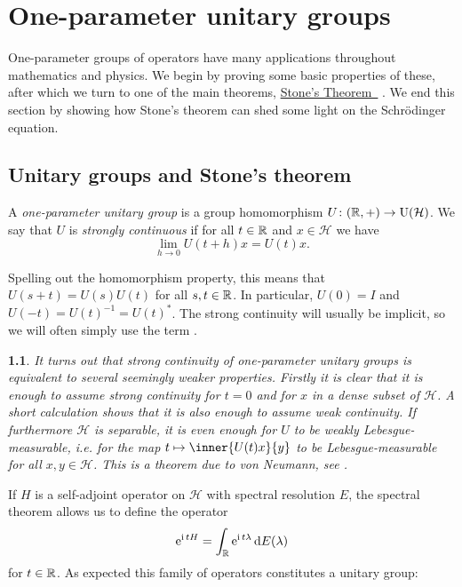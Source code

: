 \documentclass[article, a4paper, 11pt, oneside]{memoir}
\makeatletter
\numberwithin{equation}{chapter}
\newcommand{\calH}{\mathcal{H}}
\theoremstyle{myexample}
\newtheorem{remark}[theorem]{\protect\@remark}
\theoremstyle{myexample}
\theoremstyle{myexamplebreak}
\theoremstyle{myexamplebreak}
\theoremstyle{nonumberplain}
\theoremstyle{MyNonumberplain}
\newcommand{\mynameref}[2]{%
    \hyperref[#1]{#2~\labelcref*{#1}}%
}
\newcommand{\@remark}{}
\renewcommand{\@remark}{Remark}%
\renewcommand{\@remark}{Bemærkning}%
\makeatother
\begin{document}
\chapter{One-parameter unitary groups}

One-parameter groups of operators have many applications throughout mathematics and physics. We begin by proving some basic properties of these, after which we turn to one of the main theorems, \mynameref{thm:stone}{Stone's Theorem}. We end this section by showing how Stone's theorem can shed some light on the Schrödinger equation.


\section{Unitary groups and Stone's theorem}

\begin{definition}
    A \emph{one-parameter unitary group} is a group homomorphism $U \colon (\setR, +) \to \unitary(\calH)$. We say that $U$ is \emph{strongly continuous} if for all $t \in \mathbb{R}$ and $x \in \calH$ we have
    \begin{equation*}
        \lim_{h \to 0} U(t + h)x = U(t)x.
    \end{equation*}
\end{definition}
%
Spelling out the homomorphism property, this means that $U(s+t) = U(s) U(t)$ for all $s,t \in \mathbb{R}$. In particular, $U(0) = I$ and $U(-t) = U(t)^{-1} = U(t)^*$. The strong continuity will usually be implicit, so we will often simply use the term .

\begin{remark}
    \label{rem:strong_continuity}
    It turns out that strong continuity of one-parameter unitary groups is equivalent to several seemingly weaker properties. Firstly it is clear that it is enough to assume strong continuity for $t = 0$ and for $x$ in a dense subset of $\calH$. A short calculation shows that it is also enough to assume weak continuity. If furthermore $\calH$ is separable, it is even enough for $U$ to be weakly Lebesgue-measurable, i.e. for the map $t \mapsto \inner{U(t)x}{y}$ to be Lebesgue-measurable for all $x,y \in \calH$. This is a theorem due to von Neumann, see \textcite[Theorem~VIII.9]{reedsimon1}.
\end{remark}


If $H$ is a self-adjoint operator on $\calH$ with spectral resolution $E$, the spectral theorem allows us to define the operator
%
\begin{equation*}
    \operatorname{\mathrm{e}}^{\operatorname{i} tH} = \int_{\mathbb{R}} \operatorname{\mathrm{e}}^{\operatorname{i} t \lambda} \mathop{}\!\mathrm{d} E(\lambda)
\end{equation*}
%
for $t \in \mathbb{R}$. As expected this family of operators constitutes a unitary group:
\end{document}
